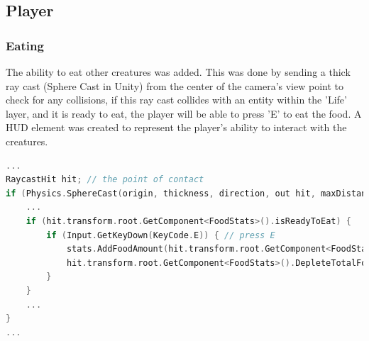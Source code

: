 \documentclass[11pt]{report}
\begin{document}
\subsection{Player}
\subsubsection{Eating}
The ability to eat other creatures was added. This was done by sending a thick ray cast (Sphere Cast in Unity) from the center of the camera's view point to check for any collisions, if this ray cast collides with an entity within the 'Life' layer, and it is ready to eat, the player will be able to press 'E' to eat the food. A HUD element was created to represent the player's ability to interact with the creatures.
\begin{lstlisting}[language=c]
...
RaycastHit hit; // the point of contact
if (Physics.SphereCast(origin, thickness, direction, out hit, maxDistance, lifeLayerMask)) {
    ...
    if (hit.transform.root.GetComponent<FoodStats>().isReadyToEat) {
        if (Input.GetKeyDown(KeyCode.E)) { // press E
            stats.AddFoodAmount(hit.transform.root.GetComponent<FoodStats>().foodAmount); // add food
            hit.transform.root.GetComponent<FoodStats>().DepleteTotalFoodAmount(hit.transform.position, hit.transform.rotation); // deplete from prey and spawn particles
        }
    }
    ...
}
...
\end{lstlisting}
\end{document}

